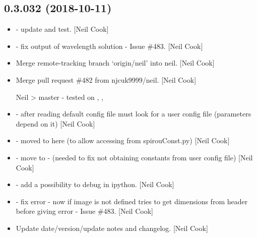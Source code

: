 \documentclass[a4paper,10pt,english]{report}
\begin{document}
\subsection{0.3.032 (2018-10-11)}
\label{\detokenize{misc/changelog:id299}}\begin{itemize}
\item {} 
 - update  and test. {[}Neil Cook{]}

\item {} 
 - fix output of wavelength solution - Issue \#483. {[}Neil
Cook{]}

\item {} 
Merge remote-tracking branch ‘origin/neil’ into neil. {[}Neil Cook{]}

\item {} 
Merge pull request \#482 from njcuk9999/neil. {[}Neil Cook{]}

Neil \textendash{}\textgreater{} master - tested on , , 

\item {} 
 - after reading default config file must look for a
user config file (parameters depend on it) {[}Neil Cook{]}

\item {} 
 - moved  to here (to allow
accessing from spirouConst.py) {[}Neil Cook{]}

\item {} 
 - move  to  -
(needed to fix not obtaining constants from user config file) {[}Neil
Cook{]}

\item {} 
 - add a possibility to debug in ipython. {[}Neil Cook{]}

\item {} 
 - fix error - now if image is not defined tries to get
dimensions from header before giving error - Issue \#483. {[}Neil Cook{]}

\item {} 
Update date/version/update notes and changelog. {[}Neil Cook{]}

\end{itemize}
\end{document}
